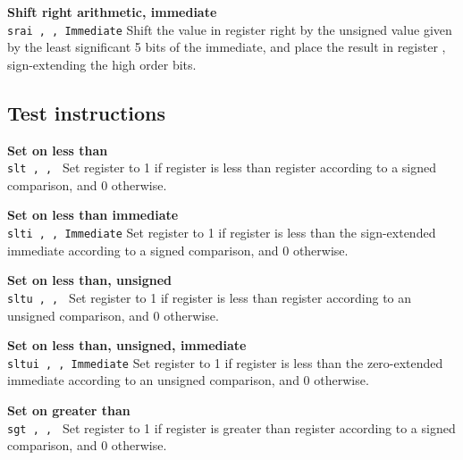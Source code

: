 \noindent
{\bf Shift right arithmetic, immediate}\\
\noindent
\texttt{srai \regd, \regs, Immediate}
Shift the value in register \regs{} right by the unsigned value given by the
least significant 5 bits of the immediate, and place the result in register \regd{},
sign-extending the high order bits.
\vspace{3ex}

\subsection{Test instructions}

\noindent
{\bf Set on less than}\\
\noindent
\texttt{slt \regd, \regs, \regt}
Set register \regd{} to 1 if register \regs{} is
less than register \regt{} according to a signed comparison, and 0 otherwise.
\vspace{3ex}

\noindent
{\bf Set on less than immediate}\\
\noindent
\texttt{slti \regd, \regs, Immediate}
Set register \regd{} to 1 if register \regs{} is
less than the sign-extended immediate according to a signed comparison, and 0 otherwise.
\vspace{3ex}
\newpage

\noindent
{\bf Set on less than, unsigned}\\
\noindent
\texttt{sltu \regd, \regs, \regt}
Set register \regd{} to 1 if register \regs{} is
less than register \regt{} according to an unsigned comparison, and 0 otherwise.
\vspace{3ex}

\noindent
{\bf Set on less than, unsigned, immediate}\\
\noindent
\texttt{sltui \regd, \regs, Immediate}
Set register \regd{} to 1 if register \regs{} is
less than the zero-extended immediate according to an unsigned comparison, and 0 otherwise.
\vspace{3ex}

\noindent
{\bf Set on greater than}\\
\noindent
\texttt{sgt \regd, \regs, \regt}
Set register \regd{} to 1 if register \regs{} is
greater than register \regt{} according to a signed comparison, and 0 otherwise.
\vspace{3ex}

